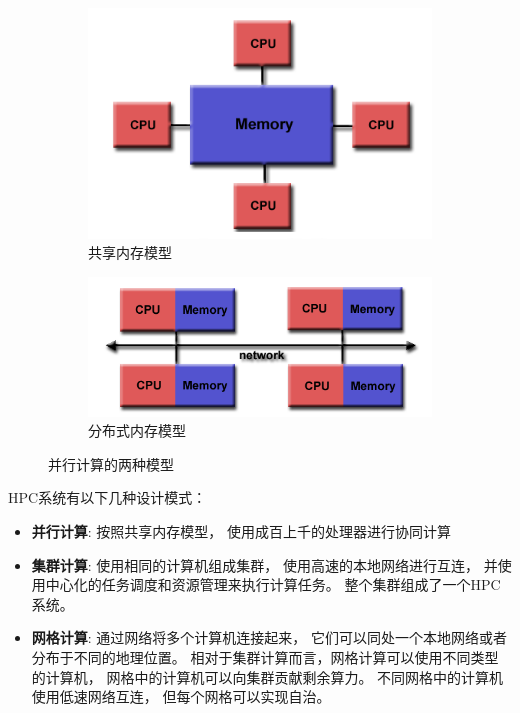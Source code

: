\begin{figure}[ht!]
    \centering
    \begin{subfigure}{.5\textwidth}
        \centering
        \includegraphics[width=0.9\linewidth]{images/shared-memory.png}
        \caption{共享内存模型}
    \end{subfigure}%
    \begin{subfigure}{.5\textwidth}
        \centering
        \includegraphics[width=\linewidth]{images/distributed-memory.png}
        \caption{分布式内存模型}
    \end{subfigure}
    \caption{并行计算的两种模型}
    \label{parallel_models}
\end{figure}

HPC系统有以下几种设计模式\cite{ibm_hpc}：

\begin{itemize}
    \item \textbf{并行计算}: 按照共享内存模型，
    使用成百上千的处理器进行协同计算
    \item \textbf{集群计算}: 使用相同的计算机组成集群，
    使用高速的本地网络进行互连，
    并使用中心化的任务调度和资源管理来执行计算任务。
    整个集群组成了一个HPC系统。
    \item \textbf{网格计算}: 通过网络将多个计算机连接起来，
    它们可以同处一个本地网络或者分布于不同的地理位置。
    相对于集群计算而言，网格计算可以使用不同类型的计算机，
    网格中的计算机可以向集群贡献剩余算力。
    不同网格中的计算机使用低速网络互连，
    但每个网格可以实现自治。
\end{itemize}

